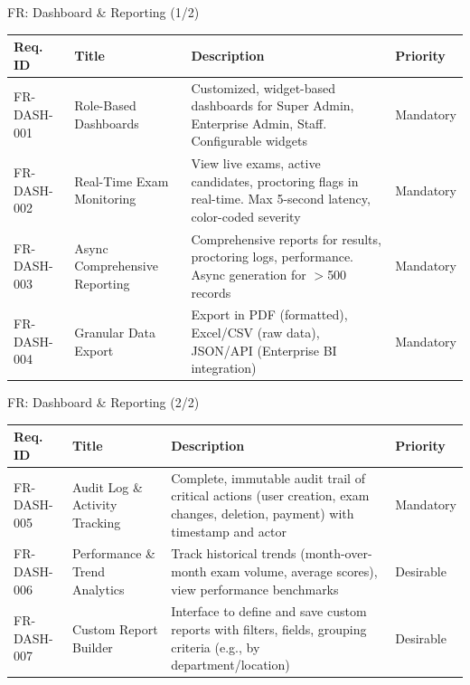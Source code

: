 \begin{frame}{FR: Dashboard \& Reporting (1/2)}
    \begin{table}[]
        \centering
        \tiny
        \begin{tabular}{|l|p{3cm}|p{5.5cm}|l|}
            \hline
            \textbf{Req. ID} & \textbf{Title} & \textbf{Description} & \textbf{Priority} \\
            \hline
            FR-DASH-001 & Role-Based Dashboards & Customized, widget-based dashboards for Super Admin, Enterprise Admin, Staff. Configurable widgets & Mandatory \\
            \hline
            FR-DASH-002 & Real-Time Exam Monitoring & View live exams, active candidates, proctoring flags in real-time. Max 5-second latency, color-coded severity & Mandatory \\
            \hline
            FR-DASH-003 & Async Comprehensive Reporting & Comprehensive reports for results, proctoring logs, performance. Async generation for $>$500 records & Mandatory \\
            \hline
            FR-DASH-004 & Granular Data Export & Export in PDF (formatted), Excel/CSV (raw data), JSON/API (Enterprise BI integration) & Mandatory \\
            \hline
        \end{tabular}
    \end{table}
\end{frame}

\begin{frame}{FR: Dashboard \& Reporting (2/2)}
    \begin{table}[]
        \centering
        \tiny
        \begin{tabular}{|l|p{3cm}|p{5.5cm}|l|}
            \hline
            \textbf{Req. ID} & \textbf{Title} & \textbf{Description} & \textbf{Priority} \\
            \hline
            FR-DASH-005 & Audit Log \& Activity Tracking & Complete, immutable audit trail of critical actions (user creation, exam changes, deletion, payment) with timestamp and actor & Mandatory \\
            \hline
            FR-DASH-006 & Performance \& Trend Analytics & Track historical trends (month-over-month exam volume, average scores), view performance benchmarks & Desirable \\
            \hline
            FR-DASH-007 & Custom Report Builder & Interface to define and save custom reports with filters, fields, grouping criteria (e.g., by department/location) & Desirable \\
            \hline
        \end{tabular}
    \end{table}
\end{frame}

